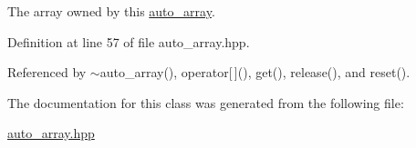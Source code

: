 \-The array owned by this \hyperlink{classLibWheel_1_1auto__array}{auto\-\_\-array}. 



\-Definition at line 57 of file auto\-\_\-array.\-hpp.



\-Referenced by $\sim$auto\-\_\-array(), operator\mbox{[}$\,$\mbox{]}(), get(), release(), and reset().



\-The documentation for this class was generated from the following file\-:\begin{DoxyCompactItemize}
\item 
\hyperlink{auto__array_8hpp}{auto\-\_\-array.\-hpp}\end{DoxyCompactItemize}
